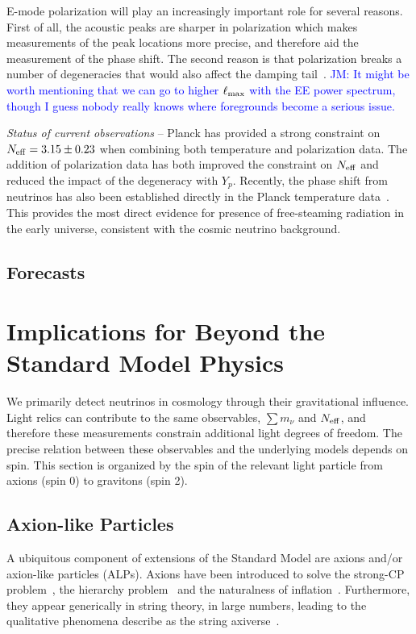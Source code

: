 E-mode polarization will play an increasingly important role for several reasons.  First of all, the acoustic peaks are sharper in polarization which makes measurements of the peak locations more precise, and therefore aid the measurement of the phase shift.  The second reason is that polarization breaks a number of degeneracies that would also affect the damping tail~\cite{Baumann:2015rya}. \textcolor{blue}{JM: It might be worth mentioning that we can go to higher $\ell_{\rm max}$ with the EE power spectrum, though I guess nobody really knows where foregrounds become a serious issue.}

{\it Status of current observations} -- Planck has provided a strong constraint on $N_{\rm eff} = 3.15 \pm 0.23$ when combining both temperature and polarization data.  The addition of polarization data has both improved the constraint on $N_{\rm eff}$ and reduced the impact of the degeneracy with $Y_p$.  Recently, the phase shift from neutrinos has also been established directly in the Planck temperature data~\cite{Follin:2015hya}.  This provides the most direct evidence for presence of free-steaming radiation in the early universe, consistent with the cosmic neutrino background.


\subsection{Forecasts}



\section{Implications for Beyond the Standard Model Physics}

We primarily detect neutrinos in cosmology through their gravitational influence.  Light relics can contribute to the same observables, $\sum m_\nu$ and $N_{\rm eff}$, and therefore these measurements constrain additional light degrees of freedom.  The precise relation between these observables and the underlying models depends on spin.  This section is organized by the spin of the relevant light particle from axions (spin 0) to gravitons (spin 2).  

\subsection{Axion-like Particles}\label{sec:axions}

A ubiquitous component of extensions of the Standard Model are axions and/or axion-like particles (ALPs).  Axions have been introduced to solve the strong-CP problem~\cite{Peccei:1977hh}, the hierarchy problem~\cite{Graham:2015cka} and the naturalness of inflation~\cite{Freese:1990rb}.  Furthermore, they appear generically in string theory, in large numbers, leading to the qualitative phenomena describe as the string axiverse~\cite{Arvanitaki:2009fg}.

